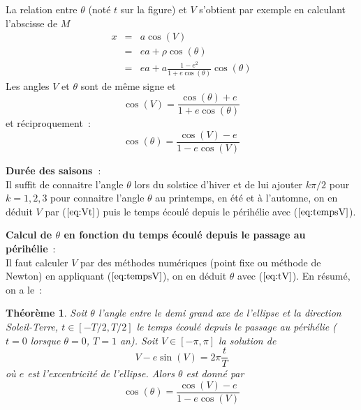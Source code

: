 \documentclass[a4paper,11pt]{article}
\newtheorem{thm}{Théorème}
\begin{document}
\begin{giacjshere}
La relation entre $\theta$ (not\'e $t$ sur la figure)
et $V$ s'obtient par exemple en calculant 
l'abscisse de $M$ 
\begin{eqnarray*} 
x &= &a \cos(V) \\
 &= & ea + \rho \cos(\theta) \\
 &= & ea + a\frac{1-e^2}{1+e\cos(\theta)} \cos(\theta)
\end{eqnarray*}
Les angles $V$ et $\theta$ sont de même signe et
\begin{equation} \label{eq:Vt}
 \cos(V) = \frac{\cos(\theta)+e}{1+e\cos(\theta)}
\end{equation}
et réciproquement~:
\begin{equation} \label{eq:tV}
 \cos(\theta)=\frac{\cos(V)-e}{1-e \cos(V)} 
\end{equation}

{\bf Durée des saisons~}:\\
Il suffit de connaitre l'angle $\theta$ lors du solstice d'hiver et
de lui ajouter $k\pi/2$ pour $k=1,2,3$ pour connaitre l'angle $\theta$
au printemps, en été et à l'automne, on en déduit $V$ par (\(\ref{eq:Vt}\)) 
puis le temps écoulé depuis le p\'erihélie avec (\(\ref{eq:tempsV}\)).

{\bf Calcul de $\theta$ en fonction du temps écoulé depuis le passage
au p\'erihélie}~:\\
Il faut calculer $V$ par des méthodes numériques (point fixe ou 
méthode de Newton) en appliquant (\(\ref{eq:tempsV}\)), on en déduit
$\theta$ avec (\(\ref{eq:tV}\)).
En résumé, on a le~:
\begin{thm}
Soit $\theta$ l'angle entre le demi grand axe de l'ellipse et 
la direction Soleil-Terre, $t\in [-T/2,T/2]$ le temps écoulé depuis le passage
au périhélie ($t=0$ lorsque $\theta=0$, $T=1$ an). Soit $V\in [-\pi,\pi]$ 
la solution de 
\[  V - e \sin(V) = 2\pi \frac{t}{T} \]
où $e$ est l'excentricité de l'ellipse.
Alors $\theta$ est donné par
\[  \cos(\theta)=\frac{\cos(V)-e}{1-e \cos(V)}  \]
\end{thm}


\end{giacjshere}
\end{document}
